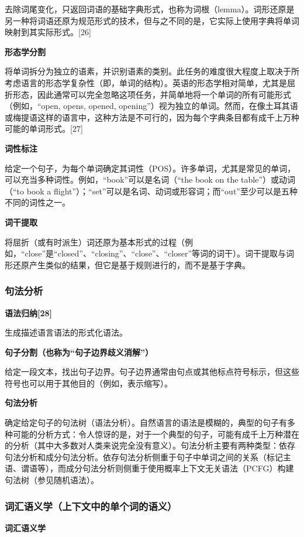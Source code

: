 去除词尾变化，只返回词语的基础字典形式，也称为词根（lemma）。词形还原是另一种将词语还原为规范形式的技术，但与之不同的是，它实际上使用字典将单词映射到其实际形式。[26]

\textbf{形态学分割}  

将单词拆分为独立的语素，并识别语素的类别。此任务的难度很大程度上取决于所考虑语言的形态学复杂性（即，单词的结构）。英语的形态学相对简单，尤其是屈折形态，因此通常可以完全忽略这项任务，并简单地将一个单词的所有可能形式（例如，“open, opens, opened, opening”）视为独立的单词。然而，在像土耳其语或梅提语这样的语言中，这种方法是不可行的，因为每个字典条目都有成千上万种可能的单词形式。[27]

\textbf{词性标注}  

给定一个句子，为每个单词确定其词性（POS）。许多单词，尤其是常见的单词，可以充当多种词性。例如，“book”可以是名词（“the book on the table”）或动词（“to book a flight”）；“set”可以是名词、动词或形容词；而“out”至少可以是五种不同的词性之一。

\textbf{词干提取}  

将屈折（或有时派生）词还原为基本形式的过程（例如，“close”是“closed”、“closing”、“close”、“closer”等词的词干）。词干提取与词形还原产生类似的结果，但它是基于规则进行的，而不是基于字典。

\subsubsection{句法分析}
\textbf{语法归纳[28]}  

生成描述语言语法的形式化语法。

\textbf{句子分割（也称为“句子边界歧义消解”）} 

给定一段文本，找出句子边界。句子边界通常由句点或其他标点符号标示，但这些符号也可以用于其他目的（例如，表示缩写）。

\textbf{句法分析}  

确定给定句子的句法树（语法分析）。自然语言的语法是模糊的，典型的句子有多种可能的分析方式：令人惊讶的是，对于一个典型的句子，可能有成千上万种潜在的分析（其中大多数对人类来说完全没有意义）。句法分析主要有两种类型：依存句法分析和成分句法分析。依存句法分析侧重于句子中单词之间的关系（标记主语、谓语等），而成分句法分析则侧重于使用概率上下文无关语法（PCFG）构建句法树（参见随机语法）。
\subsubsection{词汇语义学（上下文中的单个词的语义）}
\textbf{词汇语义学}  

